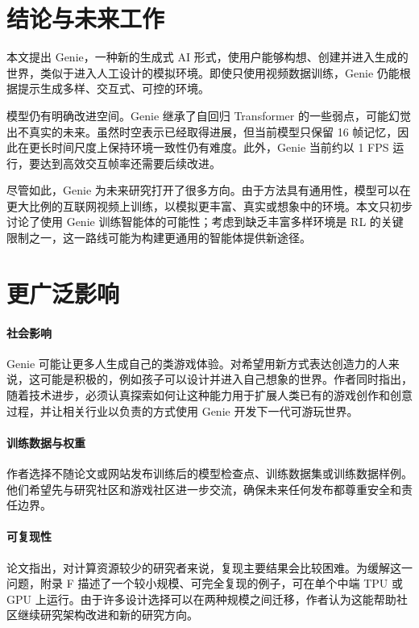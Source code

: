 \documentclass[10pt]{article}
\begin{document}
\section{结论与未来工作}

本文提出 Genie，一种新的生成式 AI 形式，使用户能够构想、创建并进入生成的世界，类似于进入人工设计的模拟环境。即使只使用视频数据训练，Genie 仍能根据提示生成多样、交互式、可控的环境。

模型仍有明确改进空间。Genie 继承了自回归 Transformer 的一些弱点，可能幻觉出不真实的未来。虽然时空表示已经取得进展，但当前模型只保留 16 帧记忆，因此在更长时间尺度上保持环境一致性仍有难度。此外，Genie 当前约以 1 FPS 运行，要达到高效交互帧率还需要后续改进。

尽管如此，Genie 为未来研究打开了很多方向。由于方法具有通用性，模型可以在更大比例的互联网视频上训练，以模拟更丰富、真实或想象中的环境。本文只初步讨论了使用 Genie 训练智能体的可能性；考虑到缺乏丰富多样环境是 RL 的关键限制之一，这一路线可能为构建更通用的智能体提供新途径。

\section*{更广泛影响}

\paragraph{社会影响}
Genie 可能让更多人生成自己的类游戏体验。对希望用新方式表达创造力的人来说，这可能是积极的，例如孩子可以设计并进入自己想象的世界。作者同时指出，随着技术进步，必须认真探索如何让这种能力用于扩展人类已有的游戏创作和创意过程，并让相关行业以负责的方式使用 Genie 开发下一代可游玩世界。

\paragraph{训练数据与权重}
作者选择不随论文或网站发布训练后的模型检查点、训练数据集或训练数据样例。他们希望先与研究社区和游戏社区进一步交流，确保未来任何发布都尊重安全和责任边界。

\paragraph{可复现性}
论文指出，对计算资源较少的研究者来说，复现主要结果会比较困难。为缓解这一问题，附录 F 描述了一个较小规模、可完全复现的例子，可在单个中端 TPU 或 GPU 上运行。由于许多设计选择可以在两种规模之间迁移，作者认为这能帮助社区继续研究架构改进和新的研究方向。
\end{document}
